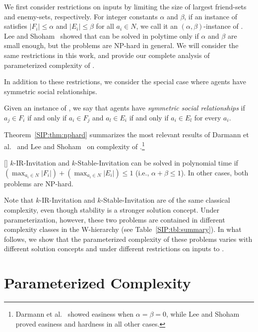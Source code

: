 We first consider restrictions on inputs by limiting the size of largest friend-sets and enemy-sets, respectively. 
For integer constants $\alpha$ and $\beta$, if an instance of \SIPs satisfies $|F_i| \leq \alpha$ and $|E_i| \leq \beta$ for all $a_i\in N$, we call it an $(\alpha,\beta)$-instance of \SIP. 
Lee and Shoham~\cite{LEE15AAAI} showed that \SIPs can be solved in polytime only if $\alpha$ and $\beta$ are small enough, but the problems are NP-hard in general. We will consider the same restrictions in this work, and provide our complete analysis of parameterized complexity of \SIP.

In addition to these restrictions, we consider the special case where agents have symmetric social relationships.
\begin{definition} \label{SIP:def:symmetric_social}
	Given an instance of \SIP, we say that agents have {\em symmetric social relationships} if $a_j\in F_i$ if and only if $a_i\in F_j$ and $a_l \in E_i$ if and only if $a_i \in E_l$ for every $a_i$. 
\end{definition}

Theorem~\ref{SIP:thm:nphard} summarizes the most relevant results of Darmann et al.~\cite{GASP12WINE} and Lee and Shoham~\cite{LEE15AAAI} on complexity of \SIPs.\footnote{
Darmann et al.~\cite{GASP12WINE} showed easiness when $\alpha=\beta=0$, while Lee and Shoham~\cite{LEE15AAAI} proved easiness and hardness in all other cases.}
\begin{theorem} \label{SIP:thm:nphard} [\cite{LEE15AAAI,GASP12WINE}]
	$k$-IR-Invitation and $k$-Stable-Invitation can be solved in polynomial time if $(\max_{a_i \in N} |F_i|) + (\max_{a_i \in N} |E_i|) \leq 1$ (i.e., $\alpha + \beta \leq 1$). In other cases, both problems are NP-hard.
\end{theorem}
Note that $k$-IR-Invitation and $k$-Stable-Invitation are of the same classical complexity, even though stability is a stronger solution concept. Under parameterization, however, these two problems are contained in different complexity classes in the W-hierarchy (see Table~\ref{SIP:tbl:summary}).
In what follows, we show that the parameterized complexity of these problems varies with different solution concepts and under different restrictions on inputs to \SIP.





\section{Parameterized Complexity} \label{SIP:sec:results}

